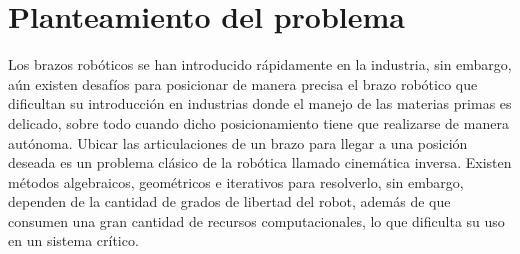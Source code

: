 \section{Planteamiento del problema}

Los brazos robóticos se han introducido rápidamente en la industria, sin embargo, aún existen desafíos para posicionar de manera precisa el brazo robótico que dificultan su introducción en industrias donde el manejo de las materias primas es delicado, sobre todo cuando dicho posicionamiento tiene que realizarse de manera autónoma.
\newline\newline\newline
Ubicar las articulaciones de un brazo para llegar a una posición deseada es un problema clásico de la robótica llamado cinemática inversa. Existen métodos algebraicos, geométricos e iterativos para resolverlo, sin embargo, dependen de la cantidad de grados de libertad del robot, además de que consumen una gran cantidad de recursos computacionales, lo que dificulta su uso en un sistema crítico.